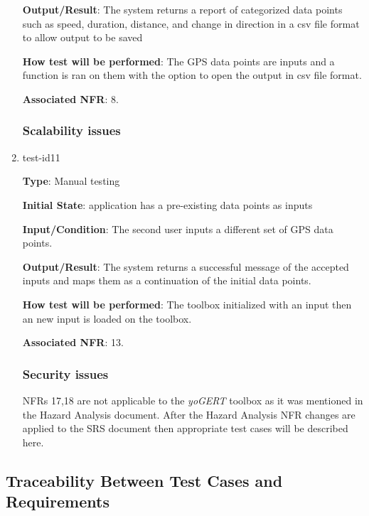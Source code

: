 \documentclass[12pt, titlepage]{article}
\begin{document}
\begin{enumerate}
\textbf{Output/Result}: The system returns a report of categorized data points such
as speed, duration, distance, and change in direction in a csv file format to allow output to be saved
					
\textbf{How test will be performed}: The GPS data points are inputs and a function is ran on them with the option to open the output in csv file format.

\textbf{Associated NFR}: 8.

\subsubsection{Scalability issues}

\item{test-id11\\}

\textbf{Type}: Manual testing
					
\textbf{Initial State}: application has a pre-existing data points as inputs
					
\textbf{Input/Condition}: The second user inputs a different set of GPS data points.
					
\textbf{Output/Result}: The system returns a successful message of the accepted inputs and maps them as a continuation of the initial data points. 
					
\textbf{How test will be performed}: The toolbox initialized with an input then an new input is loaded on the toolbox. 

\textbf{Associated NFR}: 13.

\subsubsection{Security issues}
NFRs 17,18  are not applicable to the \emph{yoGERT} toolbox as it was mentioned in the Hazard Analysis document. After the Hazard Analysis NFR changes are applied to the SRS document then appropriate test cases will be described here.

\end{enumerate}
\subsection{Traceability Between Test Cases and Requirements}
\end{document}

